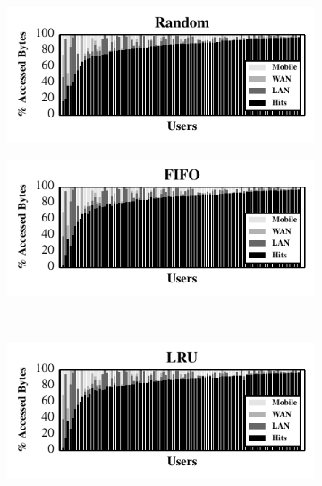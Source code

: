 \begin{figure}[t]

  \begin{subfigure}[t]{0.5\columnwidth}

    \includegraphics[width=\columnwidth]{./figures/pocketlocker/RandomSimulatorPerformanceGraph.pdf}

  \end{subfigure}%
  \begin{subfigure}[t]{0.5\columnwidth}

    \includegraphics[width=\columnwidth]{./figures/pocketlocker/FIFOSimulatorPerformanceGraph.pdf}

  \end{subfigure}\\
  \begin{subfigure}[t]{0.5\columnwidth}

    \includegraphics[width=\columnwidth]{./figures/pocketlocker/LRUSimulatorPerformanceGraph.pdf}


\end{subfigure}
\end{figure}
